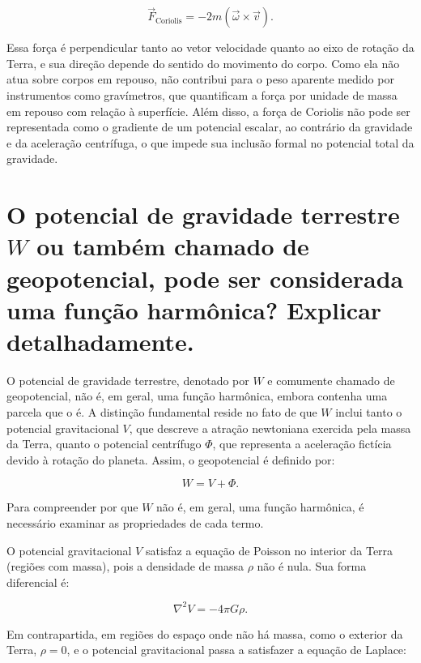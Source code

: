 \[
\vec{F}_\text{Coriolis} = -2m (\vec{\omega} \times \vec{v}) \text{.}
\]

\noindent
Essa força é perpendicular tanto ao vetor velocidade quanto ao eixo de rotação da Terra, e sua direção depende do sentido do movimento do corpo. Como ela não atua sobre corpos em repouso, não contribui para o peso aparente medido por instrumentos como gravímetros, que quantificam a força por unidade de massa em repouso com relação à superfície. Além disso, a força de Coriolis não pode ser representada como o gradiente de um potencial escalar, ao contrário da gravidade e da aceleração centrífuga, o que impede sua inclusão formal no potencial total da gravidade.


\section{O potencial de gravidade terrestre $W$ ou também chamado de geopotencial, pode ser considerada uma função harmônica? Explicar detalhadamente.}

O potencial de gravidade terrestre, denotado por \( W \) e comumente chamado de geopotencial, não é, em geral, uma função harmônica, embora contenha uma parcela que o é. A distinção fundamental reside no fato de que \( W \) inclui tanto o potencial gravitacional \( V \), que descreve a atração newtoniana exercida pela massa da Terra, quanto o potencial centrífugo \( \Phi \), que representa a aceleração fictícia devido à rotação do planeta. Assim, o geopotencial é definido por:

\[
W = V + \Phi \text{.}
\]

\noindent
Para compreender por que \( W \) não é, em geral, uma função harmônica, é necessário examinar as propriedades de cada termo.

O potencial gravitacional \( V \) satisfaz a equação de Poisson no interior da Terra (regiões com massa), pois a densidade de massa \( \rho \) não é nula. Sua forma diferencial é:

\[
\nabla^2 V = -4\pi G \rho \text{.}
\]

Em contrapartida, em regiões do espaço onde não há massa, como o exterior da Terra, \( \rho = 0 \), e o potencial gravitacional passa a satisfazer a equação de Laplace:

